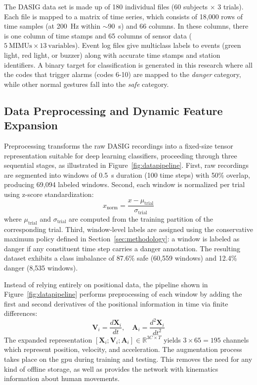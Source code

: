 \documentclass[a4paper,fleqn]{cas-sc}
\begin{document}
The DASIG data set is made up of 180 individual files (60 subjects $\times$ 3 trials). Each file is mapped to a matrix of time series, which consists of 18,000 rows of time samples (at 200~Hz within $\sim$90~s) and 66 columns. In these columns, there is one column of time stamps and 65 columns of sensor data ($5~\text{MIMUs} \times 13~\text{variables}$). Event log files give multiclass labels to events (green light, red light, or buzzer) along with accurate time stamps and station identifiers. A binary target for classification is generated in this research where all the codes that trigger alarms (codes 6-10) are mapped to the \textit{danger} category, while other normal gestures fall into the \textit{safe} category.

\subsection{Data Preprocessing and Dynamic Feature Expansion}

Preprocessing transforms the raw DASIG recordings into a fixed-size tensor representation suitable for deep learning classifiers, proceeding through three sequential stages, as illustrated in Figure~\ref{fig:datapipeline}. First, raw recordings are segmented into windows of 0.5~s duration (100 time steps) with 50\% overlap, producing 69,094 labeled windows. Second, each window is normalized per trial using z-score standardization:
\begin{equation}
    x_{\text{norm}} = \frac{x - \mu_{\text{trial}}}{\sigma_{\text{trial}}}
\end{equation}
where $\mu_{\text{trial}}$ and $\sigma_{\text{trial}}$ are computed from the training partition of the corresponding trial. Third, window-level labels are assigned using the conservative maximum policy defined in Section~\ref{sec:methodology}: a window is labeled as danger if any constituent time step carries a danger annotation. The resulting dataset exhibits a class imbalance of 87.6\% safe (60,559 windows) and 12.4\% danger (8,535 windows).

Instead of relying entirely on positional data, the pipeline shown in Figure~\ref{fig:datapipeline} performs preprocessing of each window by adding the first and second derivatives of the positional information in time via finite differences:
\begin{equation}
    \mathbf{V}_i = \frac{d\mathbf{X}_i}{dt}, \quad \mathbf{A}_i = \frac{d^2\mathbf{X}_i}{dt^2}
\end{equation}
The expanded representation $[\mathbf{X}_i; \mathbf{V}_i; \mathbf{A}_i] \in \mathbb{R}^{3C \times T}$ yields $3 \times 65 = 195$ channels which represent position, velocity, and acceleration. The augmentation process takes place on the \ac{gpu} during training and testing. This removes the need for any kind of offline storage, as well as provides the network with kinematics information about human movements.
\end{document}
